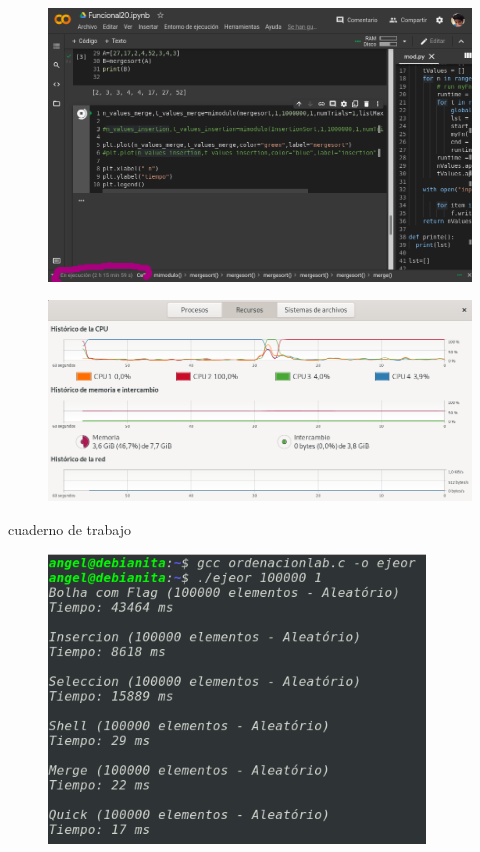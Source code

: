 \documentclass[a4paper]{article}
\begin{document}
\begin{figure}[H]%
\centering
\includegraphics[width=14cm]{imagenes/cap.png}
\caption{}
\end{figure}

\begin{figure}[H]%
\centering
\includegraphics[width=13cm]{imagenes/cpus.png}
\caption{}
\end{figure}


cuaderno de trabajo
\cite{colab}


\begin{figure}[H]%

\centering
\includegraphics[width=10cm]{imagenes/t100milc.png}
\caption{}

\end{figure}
\end{document}
